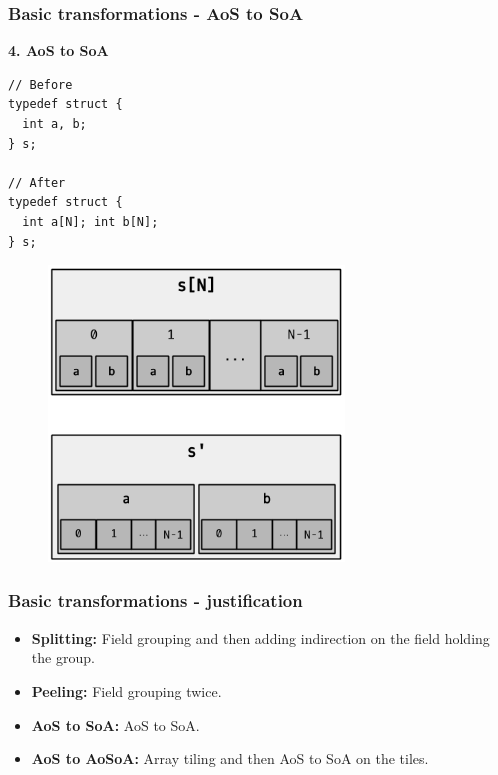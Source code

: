 \begin{frame}[fragile]
\frametitle{Basic transformations - AoS to SoA}

\begin{center}
\begin{minipage}{0.3\linewidth}
\textbf{\small 4. AoS to SoA}
\begin{lstlisting}[style=Cstyle, basicstyle=\scriptsize]
// Before
typedef struct {
  int a, b;
} s;

// After
typedef struct {
  int a[N]; int b[N];
} s;
\end{lstlisting}
\end{minipage}%
\begin{minipage}{0.5\linewidth}
\begin{figure}
	\centering
	\includegraphics[width=0.7\textwidth]{images/soa}
\end{figure}
\end{minipage}
\end{center}

\end{frame}


\begin{frame}[fragile]
\frametitle{Basic transformations - justification}

\begin{itemize}
	\setlength\itemsep{1.5em}	\item \textbf{Splitting:} Field grouping and then adding indirection on the field holding the group. \pause
	\item \textbf{Peeling:} Field grouping twice. \pause
	\item \textbf{AoS to SoA:} AoS to SoA. \pause
	\item \textbf{AoS to AoSoA:} Array tiling and then AoS to SoA on the tiles.
\end{itemize}

\end{frame}



